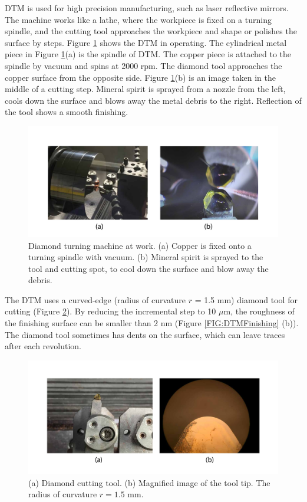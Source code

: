\documentclass[pdflatex, sectionletters, 12pt]{pittetd}    %
\begin{document}
DTM is used for high precision manufacturing, such as laser reflective mirrors. The machine works like a lathe, where the workpiece is fixed on a turning spindle, and the cutting tool approaches the workpiece and shape or polishes the surface by steps. Figure \ref{FIG:DTM} shows the DTM in operating. The cylindrical metal piece in Figure \ref{FIG:DTM}(a) is the spindle of DTM. The copper piece is attached to the spindle by vacuum and spins at 2000 rpm. The diamond tool approaches the copper surface from the opposite side. Figure \ref{FIG:DTM}(b) is an image taken in the middle of a cutting step. Mineral spirit is sprayed from a nozzle from the left, cools down the surface and blows away the metal debris to the right. Reflection of the tool shows a smooth finishing.

\begin{figure}[h!]
	\centering
	\includegraphics[width=1.0\textwidth]{Drawing/DTM.pdf}
	\caption{Diamond turning machine at work. (a) Copper is fixed onto a turning spindle with vacuum. (b) Mineral spirit is sprayed to the tool and cutting spot, to cool down the surface and blow away the debris.}
	\label{FIG:DTM}
\end{figure}

The DTM uses a curved-edge (radius of curvature $r$ = 1.5 mm) diamond tool for cutting (Figure \ref{FIG:DiamondTool}). By reducing the incremental step to 10 $\mu$m, the roughness of the finishing surface can be smaller than 2 nm (Figure \ref{FIG:DTMFinishing} (b)). The diamond tool sometimes has dents on the surface, which can leave traces after each revolution.

\begin{figure}[h!]
	\centering
	\includegraphics[width=1.0\textwidth]{Drawing/DiamondTool.pdf}
	\caption{(a) Diamond cutting tool. (b) Magnified image of the tool tip. The radius of curvature $r = 1.5$ mm.}
	\label{FIG:DiamondTool}
\end{figure}
\end{document}
